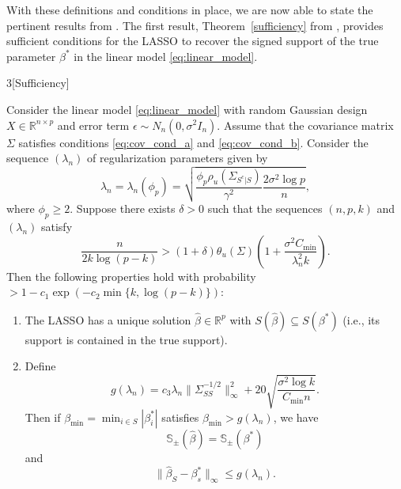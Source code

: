 \documentclass[letterpaper,12pt]{article}
\newcommand{\norm}[1]{\lVert#1\rVert}
\begin{document}
With these definitions and conditions in place, we are now able to
state the pertinent results from \cite{wainwright06}. The first
result, Theorem~\ref{sufficiency} from \cite{wainwright06}, provides
sufficient conditions for the LASSO to recover the signed support of
the true parameter $\beta^\ast$ in the linear model
\eqref{eq:linear_model}.
\begin{customthm}{3}[Sufficiency] \label{sufficiency}

  Consider the linear model \eqref{eq:linear_model} with random
  Gaussian design $X \in \mathbb{R}^{n \times p}$ and error term
  $\epsilon \sim N_n(0, \sigma^2 I_n)$. Assume that the covariance
  matrix $\Sigma$ satisfies conditions \eqref{eq:cov_cond_a} and
  \eqref{eq:cov_cond_b}. Consider the sequence $(\lambda_n)$ of
  regularization parameters given by
  \begin{equation} \label{eq:lambda_sequence}
    \lambda_n = \lambda_n(\phi_p)
      = \sqrt{\frac{\phi_p \rho_u(\Sigma_{S^c|S})}{\gamma^2}
        \frac{2\sigma^2 \log p}{n}},
  \end{equation}
  where $\phi_p \geq 2$. Suppose there exists $\delta > 0$ such that
  the sequences $(n, p, k)$ and $(\lambda_n)$ satisfy
  \begin{equation*}
    \frac{n}{2k \log (p - k)}
      > (1 + \delta) \theta_u(\Sigma)
        \left ( 1 + \frac{\sigma^2 C_{\mathrm{min}}}{\lambda_n^2 k}
        \right ).
  \end{equation*}
  Then the following properties hold with probability
  $> 1 - c_1 \exp(-c_2 \min\{k, \log(p - k)\})$:
  \begin{enumerate}[label=(\roman*)]
  \item The LASSO has a unique solution $\hat{\beta} \in \mathbb{R}^p$
    with $S(\hat{\beta}) \subseteq S(\beta^\ast)$ (i.e., its support
    is contained in the true support).

  \item Define
    \begin{equation*}
      g(\lambda_n) = c_3 \lambda_n \norm{\Sigma_{SS}^{-1/2}}_\infty^2
        + 20\sqrt{\frac{\sigma^2 \log k}{C_{\mathrm{min}} n}}.
    \end{equation*}
    Then if $\beta_{\mathrm{min}} = \min_{i \in S} |\beta^\ast_i|$
    satisfies $\beta_{\mathrm{min}} > g(\lambda_n)$, we have
    \begin{equation*}
      \mathbb{S}_\pm(\hat{\beta}) = \mathbb{S}_\pm(\beta^\ast)
    \end{equation*}
    and
    \begin{equation*}
      \norm{\hat{\beta}_S - \beta^\ast_s}_\infty \leq g(\lambda_n).
    \end{equation*}
  \end{enumerate}
\end{customthm}
\end{document}
